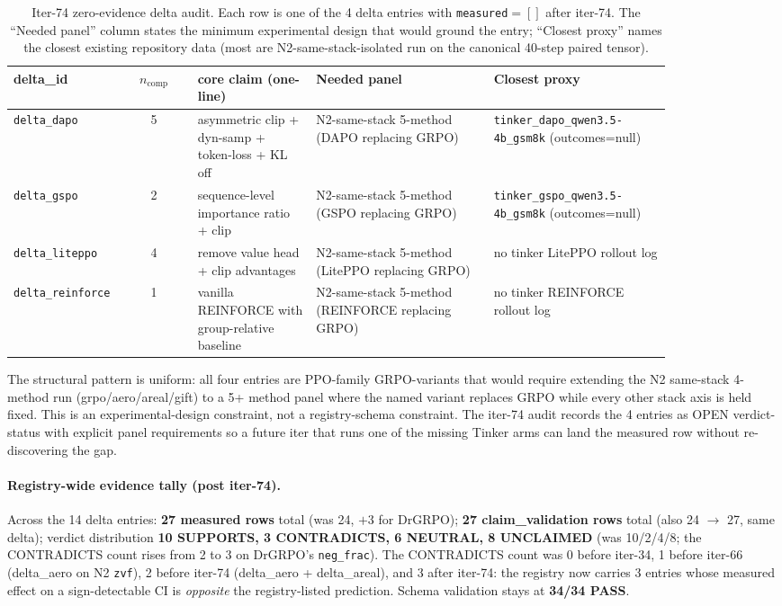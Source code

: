 \documentclass{article}
\begin{document}
\begin{table}[h]
\centering\small
\caption{Iter-74 zero-evidence delta audit. Each row is one of the
4 delta entries with \texttt{measured}$=[]$ after iter-74. The
``Needed panel'' column states the minimum experimental design that
would ground the entry; ``Closest proxy'' names the closest existing
repository data (most are N2-same-stack-isolated run on the canonical
40-step paired tensor).}
\label{tab:p6-zero-evidence-audit}
\begin{tabular}{@{}p{0.13\linewidth} c p{0.18\linewidth} p{0.27\linewidth} p{0.27\linewidth}@{}}
\toprule
delta\_id & $n_{\text{comp}}$ & core claim (one-line) & Needed panel & Closest proxy \\
\midrule
\texttt{delta\_dapo}      & 5 & asymmetric clip + dyn-samp + token-loss + KL off & N2-same-stack 5-method (DAPO replacing GRPO) & \texttt{tinker\_dapo\_qwen3.5-4b\_gsm8k} (outcomes=null) \\
\texttt{delta\_gspo}      & 2 & sequence-level importance ratio + clip         & N2-same-stack 5-method (GSPO replacing GRPO) & \texttt{tinker\_gspo\_qwen3.5-4b\_gsm8k} (outcomes=null) \\
\texttt{delta\_liteppo}   & 4 & remove value head + clip advantages           & N2-same-stack 5-method (LitePPO replacing GRPO) & no tinker LitePPO rollout log \\
\texttt{delta\_reinforce} & 1 & vanilla REINFORCE with group-relative baseline & N2-same-stack 5-method (REINFORCE replacing GRPO) & no tinker REINFORCE rollout log \\
\bottomrule
\end{tabular}
\end{table}

The structural pattern is uniform: all four entries are PPO-family
GRPO-variants that would require extending the N2 same-stack 4-method
run (grpo/aero/areal/gift) to a 5+ method panel where the named
variant replaces GRPO while every other stack axis is held fixed.
This is an experimental-design constraint, not a registry-schema
constraint. The iter-74 audit records the 4 entries as OPEN
verdict-status with explicit panel requirements so a future iter that
runs one of the missing Tinker arms can land the measured row
without re-discovering the gap.

\paragraph{Registry-wide evidence tally (post iter-74).}
Across the 14 delta entries: \textbf{27 measured rows} total (was
24, $+3$ for DrGRPO); \textbf{27 claim\_validation rows} total
(also 24 $\to$ 27, same delta); verdict distribution
\textbf{10 SUPPORTS, 3 CONTRADICTS, 6 NEUTRAL, 8 UNCLAIMED}
(was 10/2/4/8; the CONTRADICTS count rises from 2 to 3 on DrGRPO's
\texttt{neg\_frac}). The CONTRADICTS count was 0 before iter-34,
1 before iter-66 (delta\_aero on N2 \texttt{zvf}), 2 before iter-74
(delta\_aero + delta\_areal), and 3 after iter-74: the registry now
carries 3 entries whose measured effect on a sign-detectable CI is
\emph{opposite} the registry-listed prediction. Schema validation
stays at \textbf{34/34 PASS}.
\end{document}
